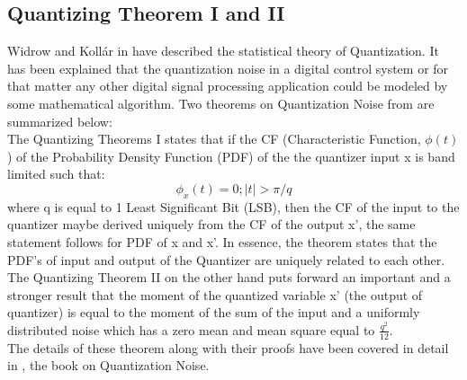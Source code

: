 \documentclass[a4paper,12pt]{article}
\begin{document}
\subsection{Quantizing Theorem I and II} Widrow and Koll\'ar in \cite{Kollar} have described the statistical theory of Quantization. It has been explained that the quantization noise in a digital control system or for that matter any other digital signal processing application could be modeled by some mathematical algorithm. Two theorems on Quantization Noise from \cite{Kollar} are summarized below:\\
The Quantizing Theorems I states that if the CF (Characteristic Function, $\phi(t)$) of the Probability Density Function (PDF) of the the quantizer input x is band limited such that:
	\begin{equation}
		\phi_x(t) = 0 ; |t| >\pi/q  
	\end{equation}
where q is equal to 1 Least Significant Bit (LSB), then the CF of the input to the quantizer maybe derived uniquely from the CF of the output x', the same statement follows for PDF of x and x'. In essence, the theorem states that the PDF's of input and output of the Quantizer are uniquely related to each other.\\
The Quantizing Theorem II on the other hand puts forward an important and a stronger result that the moment of the quantized variable x' (the output of quantizer) is equal to the moment of the sum of the input and a uniformly distributed noise which has a zero mean and mean square equal to $\frac{q^{2}}{12}$. \\
The details of these theorem along with their proofs have been covered in detail in \cite{Kollar}, the book on Quantization Noise.
\end{document}
